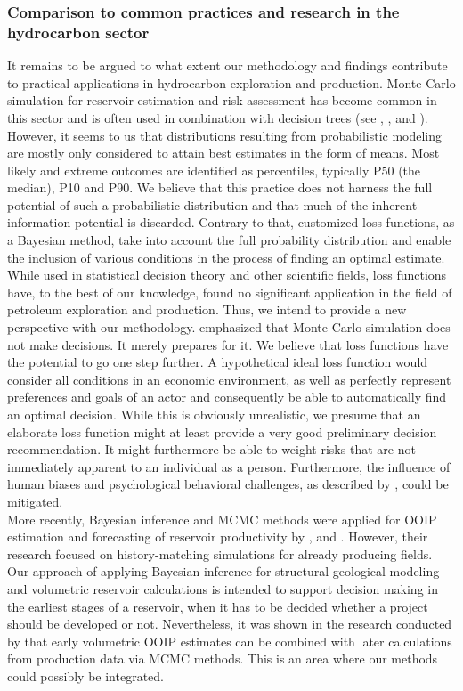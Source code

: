 	\subsubsection{Comparison to common practices and research in the hydrocarbon sector}		
	It remains to be argued to what extent our methodology and findings contribute to practical applications in hydrocarbon exploration and production. Monte Carlo simulation for reservoir estimation and risk assessment has become common in this sector and is often used in combination with decision trees (see \citet{murtha1997monte}, \citet{mudford2000valuing}, \citet{wim2001guidelines} and \citet{bratvold2010making}). However, it seems to us that distributions resulting from probabilistic modeling are mostly only considered to attain best estimates in the form of means. Most likely and extreme outcomes are identified as percentiles, typically P50 (the median), P10 and P90. We believe that this practice does not harness the full potential of such a probabilistic distribution and that much of the inherent information potential is discarded. Contrary to that, customized loss functions, as a Bayesian method, take into account the full probability distribution and enable the inclusion of various conditions in the process of finding an optimal estimate. While used in statistical decision theory and other scientific fields, loss functions have, to the best of our knowledge, found no significant application in the field of petroleum exploration and production. Thus, we intend to provide a new perspective with our methodology. \citet{murtha1997monte} emphasized that Monte Carlo simulation does not make decisions. It merely prepares for it. We believe that loss functions have the potential to go one step further. A hypothetical ideal loss function would consider all conditions in an economic environment, as well as perfectly represent preferences and goals of an actor and consequently be able to automatically find an optimal decision. While this is obviously unrealistic, we presume that an elaborate loss function might at least provide a very good preliminary decision recommendation. It might furthermore be able to weight risks that are not immediately apparent to an individual as a person. Furthermore, the influence of human biases and psychological behavioral challenges, as described by \citet{bratvold2010making}, could be mitigated.\\
	More recently, Bayesian inference and MCMC methods were applied for OOIP estimation and forecasting of reservoir productivity by \citet{wadsley2005markov}, \citet{ma2006multistage} and \citet{liu2010continuous}. However, their research focused on history-matching simulations for already producing fields. Our approach of applying Bayesian inference for structural geological modeling and volumetric reservoir calculations is intended to support decision making in the earliest stages of a reservoir, when it has to be decided whether a project should be developed or not. Nevertheless, it was shown in the research conducted by \citet{wadsley2005markov} that early volumetric OOIP estimates can be combined with later calculations from production data via MCMC methods. This is an area where our methods could possibly be integrated.\\
